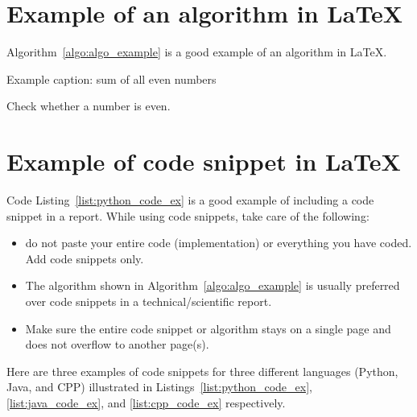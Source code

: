 \clearpage %

\section{Example of an algorithm in \LaTeX}
Algorithm~\ref{algo:algo_example} is a good example of an algorithm in \LaTeX.  
\begin{algorithm}
    \caption{Example caption: sum of all even numbers}
    \label{algo:algo_example}
    \begin{algorithmic}[1]
        \Statex
          \Comment Check whether a number is even.
        \EndIf
        \EndFor
        \State {}
        \EndFunction
    \end{algorithmic}
\end{algorithm}
 
\section{Example of code snippet  in \LaTeX}

Code Listing~\ref{list:python_code_ex} is a good example of including a code snippet in a report. While using code snippets, take care of the following:
\begin{itemize}
    \item do not paste your entire code (implementation) or everything you have coded. Add code snippets only. 
    \item The algorithm shown in Algorithm~\ref{algo:algo_example} is usually preferred over code snippets in a technical/scientific report. 
    \item Make sure the entire code snippet or algorithm stays on a single page and does not overflow to another page(s).  
\end{itemize}

Here are three examples of code snippets for three different languages (Python, Java, and CPP) illustrated in Listings~\ref{list:python_code_ex}, \ref{list:java_code_ex}, and \ref{list:cpp_code_ex} respectively.  

